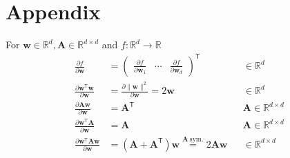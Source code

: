 \section{Appendix}
For $\mathbf{w}\in \mathbb{R}^d, \mathbf{A}\in \mathbb{R}^{d\times d}$ and $ f: \mathbb{R}^d\to \mathbb{R}$
\noindent\begin{align*}
    \frac{\partial f}{\partial \mathbf{w}}                                                                                             & =
    \begin{pmatrix}\frac{\partial f}{\partial \mathbf{w}_1} & \cdots & \frac{\partial f}{\partial \mathbf{w}_d}
    \end{pmatrix}^{\mathsf{T}} &                                                                                                                 & \in \mathbb{R}^d                                                                                                                                                \\[1em]
    \frac{\partial \mathbf{w}^{\mathsf{T}}\mathbf{w}}{\partial \mathbf{w}}                                                             & =\frac{\partial\|\mathbf{w}\|^2}{\partial \mathbf{w}}=2\mathbf{w}                                               &                  & \in \mathbb{R}^d                     \\
    \frac{\partial \mathbf{A}\mathbf{w}}{\partial \mathbf{w}}                                                                          & ={\mathbf{A}}^{\mathsf{T}}                                                                                      &                  & \mathbf{A}\in \mathbb{R}^{d\times d} \\
    \frac{\partial \mathbf{w}^{\mathsf{T}}\mathbf{A}}{\partial \mathbf{w}}                                                             & = \mathbf{A}                                                                                                    &                  & \mathbf{A}\in \mathbb{R}^{d\times d} \\
    \frac{\partial \mathbf{w}^{\mathsf{T}}\mathbf{Aw}}{\partial \mathbf{w}}                                                            & = \left(\mathbf{A}+\mathbf{A}^{\mathsf{T}}\right)\mathbf{w} \overset{\mathbf{A}\ \mathrm{sym.}}{=} 2\mathbf{Aw} &                  & \in \mathbb{R}^{d\times d}
\end{align*}